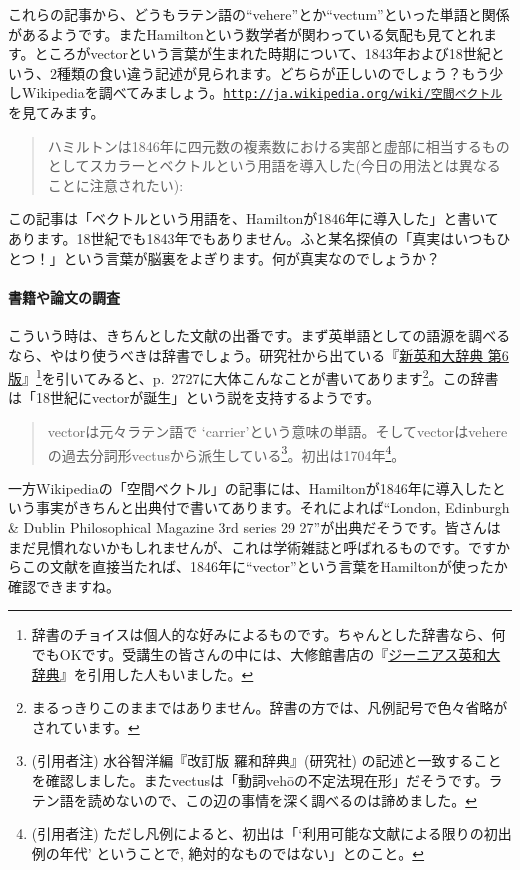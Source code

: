 これらの記事から、どうもラテン語の``vehere''とか``vectum''といった単語と関係があるようです。またHamiltonという数学者が関わっている気配も見てとれます。ところがvectorという言葉が生まれた時期について、1843年および18世紀という、$2$種類の食い違う記述が見られます。どちらが正しいのでしょう？もう少しWikipediaを調べてみましょう。\href{http://ja.wikipedia.org/wiki/\%E7\%A9\%BA\%E9\%96\%93\%E3\%83\%99\%E3\%82\%AF\%E3\%83\%88\%E3\%83\%AB}{\texttt{http://ja.wikipedia.org/wiki/空間ベクトル}} を見てみます。
\begin{quotation}
ハミルトンは1846年に四元数の複素数における実部と虚部に相当するものとしてスカラーとベクトルという用語を導入した(今日の用法とは異なることに注意されたい):
\end{quotation}

この記事は「ベクトルという用語を、Hamiltonが1846年に導入した」と書いてあります。18世紀でも1843年でもありません。ふと某名探偵の「真実はいつもひとつ！」という言葉が脳裏をよぎります。何が真実なのでしょうか？

\paragraph{書籍や論文の調査}

こういう時は、きちんとした文献の出番です。まず英単語としての語源を調べるなら、やはり使うべきは辞書でしょう。研究社から出ている『\href{http://webshop.kenkyusha.co.jp/book/978-4-7674-1016-6.html}{新英和大辞典 第6版}』\footnote{辞書のチョイスは個人的な好みによるものです。ちゃんとした辞書なら、何でもOKです。受講生の皆さんの中には、大修館書店の『\href{http://plaza.taishukan.co.jp/shop/product/detail/10177}{ジーニアス英和大辞典}』を引用した人もいました。}を引いてみると、p.~2727に大体こんなことが書いてあります\footnote{まるっきりこのままではありません。辞書の方では、凡例記号で色々省略がされています。}。この辞書は「18世紀にvectorが誕生」という説を支持するようです。
\begin{quotation}
vectorは元々ラテン語で `carrier'という意味の単語。そしてvectorはvehereの過去分詞形vectusから派生している\footnote{(引用者注) 水谷智洋編『改訂版 羅和辞典』(研究社) の記述と一致することを確認しました。またvectusは「動詞veh\=oの不定法現在形」だそうです。ラテン語を読めないので、この辺の事情を深く調べるのは諦めました。}。初出は1704年\footnote{(引用者注) ただし凡例によると、初出は「`利用可能な文献による限りの初出例の年代' ということで, 絶対的なものではない」とのこと。}。 
\end{quotation}

一方Wikipediaの「空間ベクトル」の記事には、Hamiltonが1846年に導入したという事実がきちんと出典付で書いてあります。それによれば``London, Edinburgh \& Dublin Philosophical Magazine 3rd series 29 27''が出典だそうです。皆さんはまだ見慣れないかもしれませんが、これは学術雑誌と呼ばれるものです。ですからこの文献を直接当たれば、1846年に``vector''という言葉をHamiltonが使ったか確認できますね。

